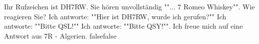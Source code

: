     {Ihr Rufzeichen ist DH7RW. Sie hören unvollständig ""... 7 Romeo Whiskey"". Wie reagieren Sie?}
    {Ich antworte: ""Hier ist DH7RW, wurde ich gerufen?""}
    {Ich antworte: ""Bitte QSL!""    }
    {Ich antworte: ""Bitte QSY!"".}
    {Ich freue mich auf eine Antwort aus 7R - Algerien.}
    {false}{false}